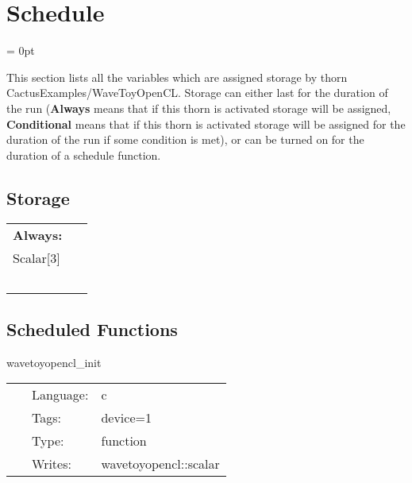 
\section{Schedule} 


\parskip = 0pt


\noindent This section lists all the variables which are assigned storage by thorn CactusExamples/WaveToyOpenCL.  Storage can either last for the duration of the run ({\bf Always} means that if this thorn is activated storage will be assigned, {\bf Conditional} means that if this thorn is activated storage will be assigned for the duration of the run if some condition is met), or can be turned on for the duration of a schedule function.


\subsection*{Storage}

\hspace{5mm}

 \begin{tabular*}{160mm}{ll} 

{\bf Always:}&  ~ \\ 
 Scalar[3] & ~\\ 
~ & ~\\ 
\end{tabular*} 


\subsection*{Scheduled Functions}
\vspace{5mm}


\hspace{5mm} wavetoyopencl\_init 

\hspace{5mm}{\it initialise scalar wave } 


\hspace{5mm}

 \begin{tabular*}{160mm}{cll} 
~ & Language:  & c \\ 
~ & Tags:  & device=1 \\ 
~ & Type:  & function \\ 
~ & Writes:  & wavetoyopencl::scalar \\ 
\end{tabular*} 


\vspace{5mm}

